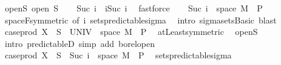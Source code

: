 \begin{isabellebody}
\ open{\isacharunderscore}{\kern0pt}S{\isacharcolon}{\kern0pt}\ {\isachardoublequoteopen}open\ S{\isachardoublequoteclose}\isanewline
\ \ \isamarkupfalse%
\ {\isachardoublequoteopen}{\isacharbraceleft}{\kern0pt}Suc\ i{\isacharbraceright}{\kern0pt}\ {\isacharequal}{\kern0pt}\ {\isacharbraceleft}{\kern0pt}i{\isacharless}{\kern0pt}{\isachardot}{\kern0pt}{\isachardot}{\kern0pt}Suc\ i{\isacharbraceright}{\kern0pt}{\isachardoublequoteclose}\ \isamarkupfalse%
\ fastforce\isanewline
\ \ \isamarkupfalse%
\ {\isachardoublequoteopen}{\isacharbraceleft}{\kern0pt}Suc\ i{\isacharbraceright}{\kern0pt}\ {\isasymtimes}\ space\ M\ {\isasymin}\ {\isasymSigma}\isactrlsub P{\isachardoublequoteclose}\ \isamarkupfalse%
\ space{\isacharunderscore}{\kern0pt}F{\isacharbrackleft}{\kern0pt}symmetric{\isacharcomma}{\kern0pt}\ of\ i{\isacharbrackright}{\kern0pt}\ sets{\isacharunderscore}{\kern0pt}predictable{\isacharunderscore}{\kern0pt}sigma\ \isamarkupfalse%
\ {\isacharparenleft}{\kern0pt}intro\ sigma{\isacharunderscore}{\kern0pt}sets{\isachardot}{\kern0pt}Basic{\isacharparenright}{\kern0pt}\ blast\isanewline
\ \ \isamarkupfalse%
\ \isamarkupfalse%
\ {\isachardoublequoteopen}case{\isacharunderscore}{\kern0pt}prod\ X\ {\isacharminus}{\kern0pt}{\isacharbackquote}{\kern0pt}\ S\ {\isasyminter}\ {\isacharparenleft}{\kern0pt}UNIV\ {\isasymtimes}\ space\ M{\isacharparenright}{\kern0pt}\ {\isasymin}\ {\isasymSigma}\isactrlsub P{\isachardoublequoteclose}\ \isamarkupfalse%
\ atLeast{\isacharunderscore}{\kern0pt}{}{\isacharbrackleft}{\kern0pt}symmetric{\isacharbrackright}{\kern0pt}\ \isamarkupfalse%
\ open{\isacharunderscore}{\kern0pt}S\ \isamarkupfalse%
\ {\isacharparenleft}{\kern0pt}intro\ predictableD{\isacharcomma}{\kern0pt}\ simp\ add{\isacharcolon}{\kern0pt}\ borel{\isacharunderscore}{\kern0pt}open{\isacharparenright}{\kern0pt}\isanewline
\ \ \isamarkupfalse%
\ \isamarkupfalse%
\ {\isachardoublequoteopen}case{\isacharunderscore}{\kern0pt}prod\ X\ {\isacharminus}{\kern0pt}{\isacharbackquote}{\kern0pt}\ S\ {\isasyminter}\ {\isacharparenleft}{\kern0pt}{\isacharbraceleft}{\kern0pt}Suc\ i{\isacharbraceright}{\kern0pt}\ {\isasymtimes}\ space\ M{\isacharparenright}{\kern0pt}\ {\isasymin}\ {\isasymSigma}\isactrlsub P{\isachardoublequoteclose}\ \isamarkupfalse%
\ sets{\isacharunderscore}{\kern0pt}predictable{\isacharunderscore}{\kern0pt}sigma\ \isamarkupfalse%

\end{isabellebody}
